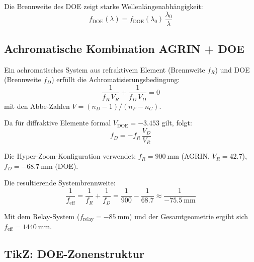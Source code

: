 ﻿\documentclass[12pt,a4paper]{article}
\theoremstyle{definition}
\newcommand{\eff}{\mathrm{eff}}
\newcommand{\DOE}{\mathrm{DOE}}
\begin{document}
	Die Brennweite des DOE zeigt starke Wellenlängenabhängigkeit:
	\begin{equation}
		f_\DOE(\lambda) = f_\DOE(\lambda_0)\,\frac{\lambda_0}{\lambda}
		\label{eq:doe_focal}
	\end{equation}
	
	\subsection{Achromatische Kombination AGRIN + DOE}
	
	Ein achromatisches System aus refraktivem Element (Brennweite $f_R$) und DOE
	(Brennweite $f_D$) erfüllt die Achromatisierungsbedingung:
	\begin{equation}
		\frac{1}{f_R\,V_R} + \frac{1}{f_D\,V_D} = 0
		\label{eq:achromat}
	\end{equation}
	mit den Abbe-Zahlen $V = (n_D - 1)/(n_F - n_C)$.
	
	Da für diffraktive Elemente formal $V_\DOE = -3.453$ gilt, folgt:
	\begin{equation}
		f_D = -f_R\,\frac{V_D}{V_R}
		\label{eq:doe_focal_achr}
	\end{equation}
	
	Die Hyper-Zoom-Konfiguration verwendet:
	$f_R = \SI{900}{\milli\metre}$ (AGRIN, $V_R = 42.7$),
	$f_D = \SI{-68.7}{\milli\metre}$ (DOE).
	
	Die resultierende Systembrennweite:
	\begin{equation}
		\frac{1}{f_\eff} = \frac{1}{f_R} + \frac{1}{f_D}
		= \frac{1}{900} - \frac{1}{68.7}
		\approx \frac{1}{\SI{-75.5}{\milli\metre}}
	\end{equation}
	
	Mit dem Relay-System ($f_\mathrm{relay} = \SI{-85}{\milli\metre}$)
	und der Gesamtgeometrie ergibt sich $f_\eff = \SI{1440}{\milli\metre}$.
	
	\subsection{TikZ: DOE-Zonenstruktur}
	
\end{document}
